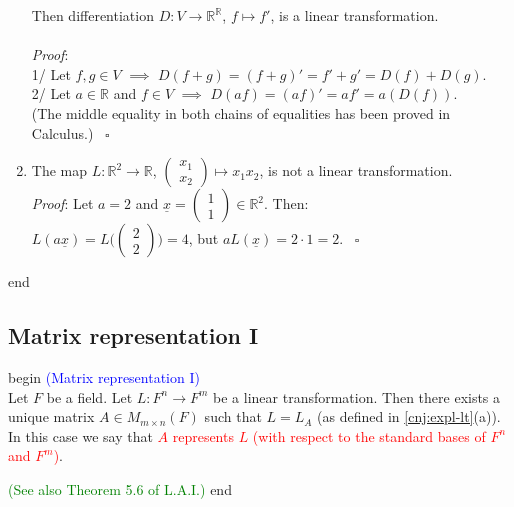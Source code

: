 \documentclass[
  12pt,
  a4paper,
  twoside]{article}
\theoremstyle{plain}
\theoremstyle{definition}
\begin{document}
\begin{enumerate}
  Then differentiation \(D: V \to \mathbb{R}^{\mathbb{R}}\), \(f \mapsto f'\), is a linear transformation.\\
  \hspace*{0.333em}\\
  \emph{Proof}:\\
  1/ Let \(f,g \in V\) \(\implies\) \(D(f+g) = (f+g)' = f' + g' = D(f) + D(g)\).\\
  2/ Let \(a \in \mathbb{R}\) and \(f \in V\) \(\implies\) \(D(af) = (af)' = a f' = a(D(f))\).\\
  (The middle equality in both chains of equalities has been proved in Calculus.)
  \hfill~{\(\square\)}
\item
  The map \(L: \mathbb{R}^{2} \to \mathbb{R}\), \(\begin{pmatrix} x_{1} \\ x_{2} \end{pmatrix} \mapsto x_{1}x_{2}\), is not a linear transformation.\\
  \emph{Proof}: Let \(a=2\) and \(\underline{x} = \begin{pmatrix} 1 \\ 1 \end{pmatrix} \in \mathbb{R}^{2}.\) Then:\\
  \(L(a \underline{x}) = L \Bigg( \begin{pmatrix} 2 \\ 2 \end{pmatrix} \Bigg) = 4\), but \(aL( \underline{x}) = 2 \cdot 1 = 2\).
  \hfill~{\(\square\)}
\end{enumerate}

\csname end

\hypertarget{ss-matrep-1}{%
\subsection{Matrix representation I}\label{ss-matrep-1}}

\csname begin\label{cnj:prop-matrep-1}
\textcolor{blue}{(Matrix representation I)}\\
Let \(F\) be a field.
Let \(L: F^{n} \to F^{m}\) be a linear transformation. Then there exists a unique matrix \(A \in M_{m \times n}(F)\) such that \(L = L_{A}\) (as defined in \ref{cnj:expl-lt}(a)). In this case we say that \textcolor{red}{$A$ represents $L$ (with respect to the standard bases of $F^{n}$ and $F^{m}$)}.

\textcolor{green}{(See also Theorem 5.6 of L.A.I.)}
\csname end
\end{document}
